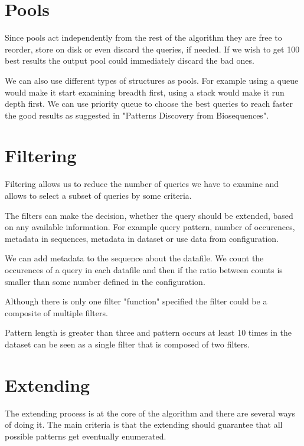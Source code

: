 \section{Pools}

Since pools act independently from the rest of the algorithm they are free to reorder, store on disk or even discard the queries, if needed. If we wish to get 100 best results the output pool could immediately discard the bad ones.

We can also use different types of structures as pools. For example using a queue would make it start examining breadth first, using a stack would make it run depth first. We can use priority queue to choose the best queries to reach faster the good results as suggested in "Patterns Discovery from Biosequences"\cite{spexs}.

\section{Filtering}

Filtering allows us to reduce the number of queries we have to examine and allows to select a subset of queries by some criteria.

The filters can make the decision, whether the query should be extended, based on any available information. For example query pattern, number of occurences, metadata in sequences, metadata in dataset or use data from configuration.

\begin{exmp}
We can add metadata to the sequence about the datafile. We count the occurences of a query in each datafile and then if the ratio between counts is smaller than some number defined in the configuration.
\end{exmp}

Although there is only one filter "function" specified the filter could be a composite of multiple filters.

\begin{exmp}
Pattern length is greater than three and pattern occurs at least 10 times in the dataset can be seen as a single filter that is composed of two filters.
\end{exmp}

\section{Extending}

The extending process is at the core of the algorithm and there are several ways of doing it. The main criteria is that the extending should guarantee that all possible patterns get eventually enumerated.

